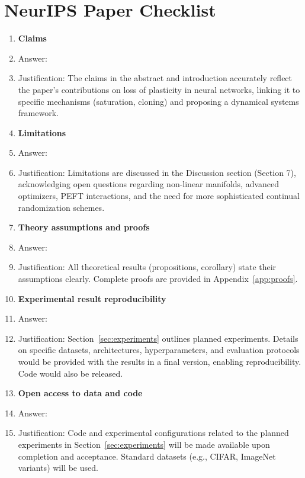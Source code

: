 \documentclass{article}
\begin{document}
\section*{NeurIPS Paper Checklist}
\begin{enumerate}
\item {\bf Claims}
    \item Answer: \answerYes{}
    \item Justification: The claims in the abstract and introduction accurately reflect the paper's contributions on loss of plasticity in neural networks, linking it to specific mechanisms (saturation, cloning) and proposing a dynamical systems framework.

\item {\bf Limitations}
    \item Answer: \answerYes{}
    \item Justification: Limitations are discussed in the Discussion section (Section 7), acknowledging open questions regarding non-linear manifolds, advanced optimizers, PEFT interactions, and the need for more sophisticated continual randomization schemes.

\item {\bf Theory assumptions and proofs}
    \item Answer: \answerYes{}
    \item Justification: All theoretical results (propositions, corollary) state their assumptions clearly. Complete proofs are provided in Appendix~\ref{app:proofs}.

\item {\bf Experimental result reproducibility}
    \item Answer: \answerNA{} %
    \item Justification: Section~\ref{sec:experiments} outlines planned experiments. Details on specific datasets, architectures, hyperparameters, and evaluation protocols would be provided with the results in a final version, enabling reproducibility. Code would also be released.

\item {\bf Open access to data and code}
    \item Answer: \answerNA{} %
    \item Justification: Code and experimental configurations related to the planned experiments in Section~\ref{sec:experiments} will be made available upon completion and acceptance. Standard datasets (e.g., CIFAR, ImageNet variants) will be used.


\end{enumerate}
\end{document}
